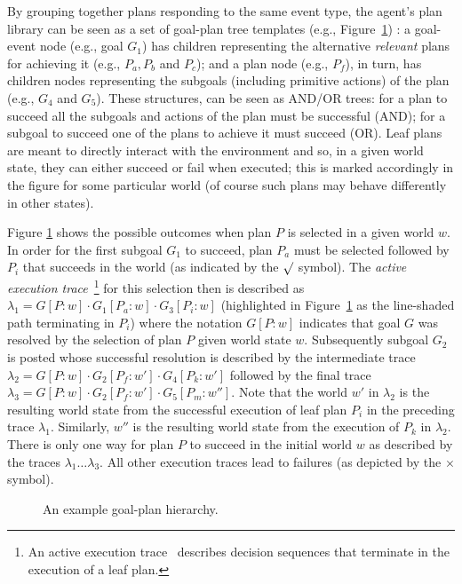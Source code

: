 By grouping together plans responding to the same event type, the agent's plan library can be seen as a set of goal-plan tree templates (e.g., Figure~\ref{fig:confidence}) \cite{ShawBordini:AAMAS08}: a goal-event node (e.g., goal $G_1$) has children representing the alternative \emph{relevant} plans for achieving it (e.g., $P_a,P_b$ and $P_c$); and a plan node (e.g., $P_f$), in turn, has children nodes representing the subgoals (including primitive actions) of the plan (e.g., $G_4$ and $G_5$). These structures, can be seen as AND/OR trees: for a plan to succeed all the subgoals and actions of the plan must be successful (AND); for a subgoal to succeed one of the plans to achieve it must succeed (OR). Leaf plans are meant to directly interact with the environment and so, in a given world state, they can either succeed or fail when executed; this is marked accordingly in the figure for some particular world (of course such plans may behave differently in other states).


Figure \ref{fig:confidence} shows the possible outcomes when plan $P$ is selected in a given world $w$. In order for the first subgoal $G_1$ to succeed, plan $P_a$ must be selected followed by $P_i$ that succeeds in the world (as indicated by the $\surd$ symbol). The {\em active execution trace}~\footnote{An active execution trace~\cite{singh10:learning} describes decision sequences that terminate in the execution of a leaf plan.} for this selection then is described as $\lambda_1=G[P:w] \cdot G_1[P_a:w] \cdot G_3[P_i:w]$ (highlighted in Figure~\ref{fig:confidence} as the line-shaded path terminating in $P_i$) where the notation $G[P:w]$ indicates that goal $G$ was resolved by the selection of plan $P$ given world state $w$. Subsequently subgoal $G_2$ is posted whose successful resolution is described by the intermediate trace $\lambda_2=G[P:w] \cdot G_2[P_f:w'] \cdot G_4[P_k:w']$ followed by the final trace $\lambda_3=G[P:w] \cdot G_2[P_f:w'] \cdot G_5[P_m:w'']$. Note that the world $w'$ in $\lambda_2$ is the resulting world state from the successful execution of leaf plan $P_i$ in the preceding trace $\lambda_1$. Similarly, $w''$ is the resulting world state from the execution of $P_k$ in $\lambda_2$. There is only one way for plan $P$ to succeed in the initial world $w$ as described by the traces $\lambda_1 \ldots \lambda_3$. All other execution traces lead to failures (as depicted by the $\times$ symbol).

\begin{figure}[t]
\begin{center}
\resizebox{0.8\columnwidth}{!}{

}
\end{center}
\vskip -0.5cm
\caption{An example goal-plan hierarchy.}
\label{fig:confidence}
\end{figure}


